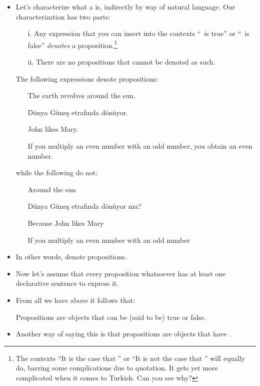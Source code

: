 \documentclass[11pt]{article}
\begin{document}
\begin{itemize}
\item Let's characterize what a  is, indirectly  by way of 
natural language. Our characterization has two parts:
\begin{itemize}
\item[i.] Any expression that you can insert into the contexts ``\cntx\ is true'' or
``\cntx\ is false'' \textit{denotes} a proposition.\footnote{The contexts ``It is
the case that \cntx'' or ``It is not the case that \cntx'' will equally do,
barring some complications due to quotation. It gets yet more complicated when it comes to Turkish.
Can you see why?}
\item [ii.] There are no propositions that cannot be denoted as such.
\end{itemize}
	
The following expressions denote propositions:
	\begin{itemize}
	\item[]The earth revolves around the sun.
	\item[]D\"unya G\"une\c s etraf\i{}nda d\"on\"uyor.
	\item[]John likes Mary.
	\item[] If you multiply an even number with an odd number, you obtain an
	even number.
	\end{itemize}

while the following do not:
	\begin{itemize}
	\item[]Around the sun
	\item[]D\"unya G\"une\c s etraf\i{}nda d\"on\"uyor mu?
	\item[]Because John likes Mary
	\item[] If you multiply an even number with an odd number
	\end{itemize}

\item In other words,  denote propositions.

\item Now let's assume that every proposition whatsoever has at least one
declarative sentence to express it.

\item From all we have above it follows that:

		Propositions are objects that can be (said to be) true or false.

\item Another way of saying this is that propositions are objects that have
. 


\end{itemize}
\end{document}
